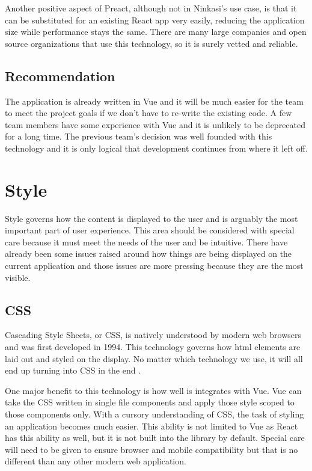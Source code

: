     Another positive aspect of Preact, although not in Ninkasi's use case, is that it can be substituted for an existing React app very easily, reducing the application size while performance stays the same. There are many large companies and open source organizations that use this technology, so it is surely vetted and reliable.
    
    \subsection{Recommendation}
    The application is already written in Vue and it will be much easier for the team to meet the project goals if we don't have to re-write the existing code. A few team members have some experience with Vue and it is unlikely to be deprecated for a long time. The previous team's decision was well founded with this technology and it is only logical that development continues from where it left off.  

\section{Style}
Style governs how the content is displayed to the user and is arguably the most important part of user experience. This area should be considered with special care because it must meet the needs of the user and be intuitive. There have already been some issues raised around how things are being displayed on the current application and those issues are more pressing because they are the most visible.
    \subsection{CSS}
    Cascading Style Sheets, or CSS, is natively understood by modern web browsers and was first developed in 1994. This technology governs how html elements are laid out and styled on the display. No matter which technology we use, it will all end up turning into CSS in the end \cite{css}. 
    
    One major benefit to this technology is how well is integrates with Vue. Vue can take the CSS written in single file components and apply those style scoped to those components only. With a cursory understanding of CSS, the task of styling an application becomes much easier. This ability is not limited to Vue as React has this ability as well, but it is not built into the library by default. Special care will need to be given to ensure browser and mobile compatibility but that is no different than any other modern web application.

